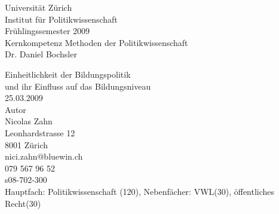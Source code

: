 \begin{titlepage}

	\begin{center}
		
		Universit\"at Z\"urich \\
		Institut f\"ur Politikwissenschaft\\
		Fr\"uhlingssemester 2009\\ \vspace{0.5cm}
		Kernkompetenz Methoden der Politikwissenschaft \\ \vspace{0.5cm}
		Dr. Daniel Bochsler
		\vspace{3cm}
		
		{\large Einheitlichkeit der Bildungspolitik}\\ \vspace{0.5cm}
		und ihr Einfluss auf das Bildungsniveau \\ \vspace{0.5cm}
		25.03.2009\\ \vspace{1.5cm}
		Autor \\
		Nicolas Zahn \\
		Leonhardstrasse 12\\
		8001 Z\"urich \\ \vspace{0.5cm}
		nici.zahn@bluewin.ch \\
		079 567 96 52 \\
		s08-702-300 \\
		Hauptfach: Politikwissenschaft (120), Nebenf\"acher: VWL(30), \"offentliches Recht(30)
	\end{center}
\end{titlepage}